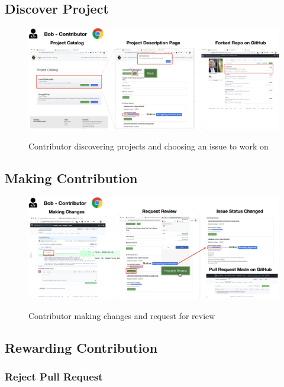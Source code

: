 \documentclass[12pt]{article}
\renewcommand{\_}{\kern-1.5pt\textunderscore\kern-1.5pt}
\begin{document}


\subsection{Discover Project}

\begin{figure}[H]
	\centering
	\includegraphics[width=16.5cm]{graphs/52. discover_1.png}\\
	\caption{Contributor discovering projects and choosing an issue to work on}
	\label{fig:discover1}
\end{figure}


\subsection{Making Contribution}
\begin{figure}[H]
	\centering
	\includegraphics[width=16.5cm]{graphs/53. contribute_1.png}\\
	\caption{Contributor making changes and request for review}
	\label{fig:contribute1}
\end{figure}

\subsection{Rewarding Contribution}


\subsubsection{Reject Pull Request}
\end{document}
